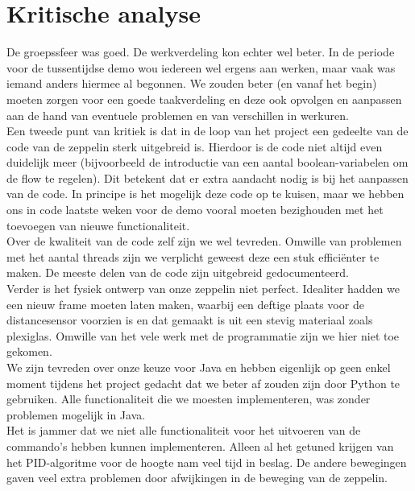 \documentclass[eind]{penoverslag}
\begin{document}
\section{Kritische analyse}
De groepssfeer was goed. De werkverdeling kon echter wel beter. In de periode voor de tussentijdse demo wou iedereen wel ergens aan werken, maar vaak was iemand anders hiermee al begonnen. We zouden beter (en vanaf het begin) moeten zorgen voor een goede taakverdeling en deze ook opvolgen en aanpassen aan de hand van eventuele problemen en van verschillen in werkuren. \\
Een tweede punt van kritiek is dat in de loop van het project een gedeelte van de code van de zeppelin sterk uitgebreid is. Hierdoor is de code niet altijd even duidelijk meer (bijvoorbeeld de introductie van een aantal boolean-variabelen om de flow te regelen). Dit betekent dat er extra aandacht nodig is bij het aanpassen van de code. In principe is het mogelijk deze code op te kuisen, maar we hebben ons in code laatste weken voor de demo vooral moeten bezighouden met het toevoegen van nieuwe functionaliteit. \\
Over de kwaliteit van de code zelf zijn we wel tevreden. Omwille van problemen met het aantal threads zijn we verplicht geweest deze een stuk effici\"enter te maken. De meeste delen van de code zijn uitgebreid gedocumenteerd. \\
Verder is het fysiek ontwerp van onze zeppelin niet perfect. Idealiter hadden we een nieuw frame moeten laten maken, waarbij een deftige plaats voor de distancesensor voorzien is en dat gemaakt is uit een stevig materiaal zoals plexiglas. Omwille van het vele werk met de programmatie zijn we hier niet toe gekomen. \\
We zijn tevreden over onze keuze voor Java en hebben eigenlijk op geen enkel moment tijdens het project gedacht dat we beter af zouden zijn door Python te gebruiken. Alle functionaliteit die we moesten implementeren, was zonder problemen mogelijk in Java. \\
Het is jammer dat we niet alle functionaliteit voor het uitvoeren van de commando's hebben kunnen implementeren. Alleen al het getuned krijgen van het PID-algoritme voor de hoogte nam veel tijd in beslag. De andere bewegingen gaven veel extra problemen door afwijkingen in de beweging van de zeppelin.
\end{document}
